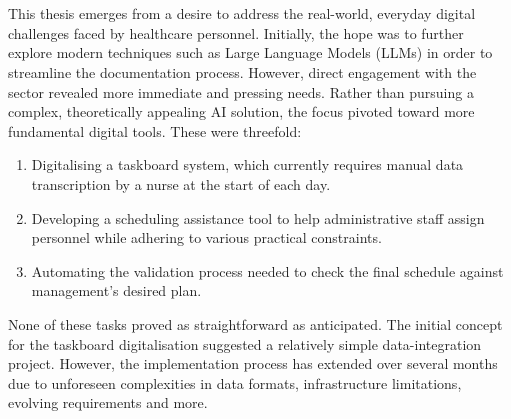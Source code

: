 \\
\\
This thesis emerges from a desire to address the real-world, everyday digital challenges faced by healthcare personnel. Initially, the hope was to further explore modern techniques such as Large Language Models (LLMs) in order to streamline the documentation process. However, direct engagement with the sector revealed more immediate and pressing needs. Rather than pursuing a complex, theoretically appealing AI solution, the focus pivoted toward more fundamental digital tools. These were threefold:
\begin{enumerate}
    \item Digitalising a taskboard system, which currently requires manual data transcription by a nurse at the start of each day.
    \item Developing a scheduling assistance tool to help administrative staff assign personnel while adhering to various practical constraints.
    \item Automating the validation process needed to check the final schedule against management's desired plan.
\end{enumerate}

None of these tasks proved as straightforward as anticipated. The initial concept for the taskboard digitalisation suggested a relatively simple data-integration project. However, the implementation process has extended over several months due to unforeseen complexities in data formats, infrastructure limitations, evolving requirements and more.

